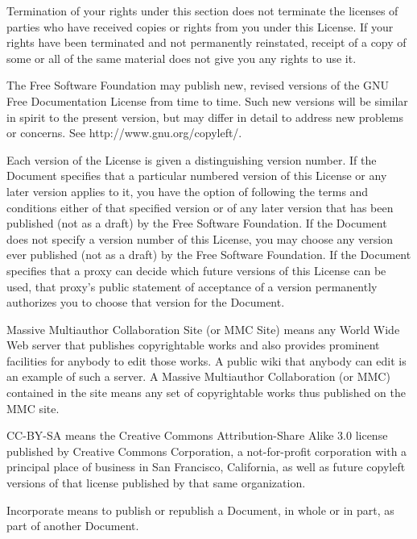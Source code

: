 \begin{BookLicense}
Termination of your rights under this section does not terminate the licenses of parties who have received copies or rights from you under this License. If your rights have been terminated and not permanently reinstated, receipt of a copy of some or all of the same material does not give you any rights to use it.

The Free Software Foundation may publish new, revised versions of the GNU Free Documentation License from time to time. Such new versions will be similar in spirit to the present version, but may differ in detail to address new problems or concerns. See http://www.gnu.org/copyleft/.

Each version of the License is given a distinguishing version number. If the Document specifies that a particular numbered version of this License \BookQuoteChar{}or any later version\BookQuoteChar{} applies to it, you have the option of following the terms and conditions either of that specified version or of any later version that has been published (not as a draft) by the Free Software Foundation. If the Document does not specify a version number of this License, you may choose any version ever published (not as a draft) by the Free Software Foundation. If the Document specifies that a proxy can decide which future versions of this License can be used, that proxy's public statement of acceptance of a version permanently authorizes you to choose that version for the Document.

\BookQuoteChar{}Massive Multiauthor Collaboration Site\BookQuoteChar{} (or \BookQuoteChar{}MMC Site\BookQuoteChar{}) means any World Wide Web server that publishes copyrightable works and also provides prominent facilities for anybody to edit those works. A public wiki that anybody can edit is an example of such a server. A \BookQuoteChar{}Massive Multiauthor Collaboration\BookQuoteChar{} (or \BookQuoteChar{}MMC\BookQuoteChar{}) contained in the site means any set of copyrightable works thus published on the MMC site.

\BookQuoteChar{}CC-BY-SA\BookQuoteChar{} means the Creative Commons Attribution-Share Alike 3.0 license published by Creative Commons Corporation, a not-for-profit corporation with a principal place of business in San Francisco, California, as well as future copyleft versions of that license published by that same organization.

\BookQuoteChar{}Incorporate\BookQuoteChar{} means to publish or republish a Document, in whole or in part, as part of another Document.


\end{BookLicense}
